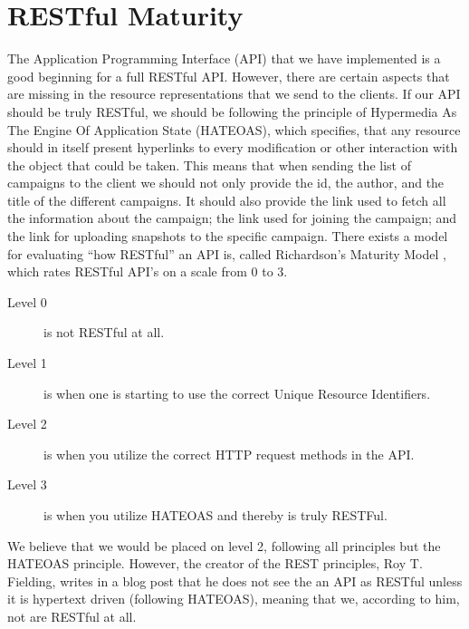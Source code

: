 
\section{RESTful Maturity}
\label{sec:restful_maturity}

The Application Programming Interface (API) that we have implemented is a good beginning for a full RESTful API. However, there are certain aspects that are missing in the resource representations that we send to the clients. If our API should be truly RESTful, we should be following the principle of Hypermedia As The Engine Of Application State (HATEOAS), which specifies, that any resource should in itself present hyperlinks to every modification or other interaction with the object that could be taken. This means that when sending the list of campaigns to the client we should not only provide the id, the author, and the title of the different campaigns. It should also provide the link used to fetch all the information about the campaign; the link used for joining the campaign; and the link for uploading snapshots to the specific campaign. There exists a model for evaluating ``how RESTful'' an API is, called Richardson's Maturity Model \parencite{richardsons_model}, which rates RESTful API's on a scale from 0 to 3. 

\begin{description}
	\item[Level 0] is not RESTful at all.
	\item[Level 1] is when one is starting to use the correct Unique Resource Identifiers.
	\item[Level 2] is when you utilize the correct HTTP request methods in the API.
	\item[Level 3] is when you utilize HATEOAS and thereby is truly RESTFul.
\end{description}

We believe that we would be placed on level 2, following all principles but the HATEOAS principle. However, the creator of the REST principles, Roy T. Fielding, writes in a blog post that he does not see the an API as RESTful unless it is hypertext driven (following HATEOAS)\parencite{http_manden_blog}, meaning that we, according to him, not are RESTful at all. 
